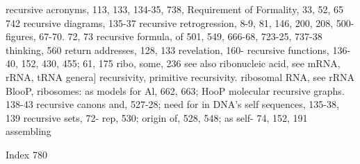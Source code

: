 recursive acronyms, 113, 133, 134-35, 738,     Requirement of Formality, 33, 52, 65
742 recursive diagrams, 135-37 recursive       retrogression, 8-9, 81, 146, 200, 208, 500-
figures, 67-70. 72, 73 recursive formula, of   501, 549, 666-68, 723-25, 737-38
thinking, 560                                  return addresses, 128, 133 revelation, 160-
recursive functions, 136-40, 152, 430, 455;    61, 175 ribo, some, 236
see also                                       ribonucleic acid, see mRNA, rRNA, tRNA
genera] recursivity, primitive recursivity.    ribosomal RNA, see rRNA
BlooP,                                         ribosomes: as models for Al, 662, 663;
HooP                                           molecular
recursive graphs. 138-43 recursive             canons and, 527-28; need for in DNA's self
sequences, 135-38, 139 recursive sets, 72-     rep, 530; origin of, 528, 548; as self-
74, 152, 191                                   assembling



Index                                                                                  780

